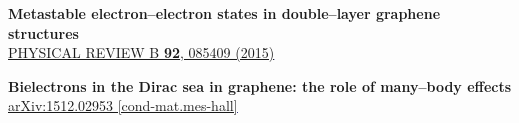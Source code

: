 \documentclass[11pt,a4paper,sans]{moderncv}        %
\begin{document}
\begin{itemize}
\small{
\item{\textbf{Metastable electron--electron states in double--layer graphene structures}\\
      \textcolor{blue}{\underline{\href{http://journals.aps.org/prb/pdf/10.1103/PhysRevB.92.085409}{\small{PHYSICAL REVIEW B \textbf{92}, 085409 (2015)}}}}}

\vspace{4pt}

\item{\textbf{Bielectrons in the Dirac sea in graphene: the role of many–body effects}\\
		\textcolor{blue}{\underline{\href{http://arxiv.org/abs/1512.02953}{\small{arXiv:1512.02953 [cond-mat.mes-hall]}}}}}
\small}
\end{itemize}
\end{document}
